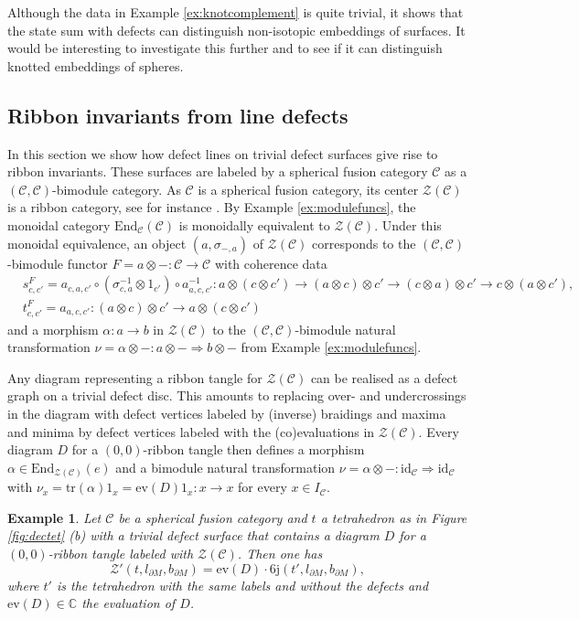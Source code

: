 \documentclass[1.5pt, a4paper]{article}
\newcommand{\C}{\mathbb{C}}
\newcommand{\mac}{\mathcal C}
\newcommand{\End}{\mathrm{End}}
\newcommand{\inv}[0]{{-1}}
\newcommand{\oo}[0]{\otimes}
\newcommand{\id}[0]{\mathrm{id}}
\newcommand{\tr}[0]{\mathrm{tr}}
\newtheorem{example}[theorem]{Example}
\begin{document}
 Although the data in Example \ref{ex:knotcomplement} is quite trivial, it shows that the state sum with defects can distinguish non-isotopic embeddings of surfaces. It would be interesting to  investigate this further and to see if it can distinguish  knotted embeddings of  spheres. 


\subsection{Ribbon invariants from line defects}


In this section we show how defect lines on trivial defect surfaces give rise to ribbon invariants.  These surfaces are labeled by a spherical fusion category $\mac$ as a $(\mac,\mac)$-bimodule category.   As $\mac$ is a spherical fusion category, its center $\mathcal Z(\mac)$ is a  ribbon category, see for instance \cite[Lemma 10.1]{TVr}. By Example \ref{ex:modulefuncs}, the monoidal category $\End_\mac(\mac)$  is  monoidally equivalent to $\mathcal Z(\mac)$. 
Under this monoidal equivalence, an object $(a, \sigma_{-,a})$ of $\mathcal Z(\mac)$  corresponds to the $(\mac,\mac)$-bimodule functor $F=a\oo -:\mac\to\mac$ with coherence data
\begin{align}\label{eq:coeherencecenter}
&s^F_{c,c'}=a_{c,a,c'}\circ (\sigma_{c,a}^\inv\oo 1_{c'})\circ a_{a,c,c'}^\inv: a\oo ( c\oo c')\to (a\oo c)\oo c'\to (c\oo a)\oo c'\to c\oo (a\oo c'),\\ 
&t^F_{c,c'}=a_{a,c,c'}: (a\oo c)\oo c'\to a\oo (c\oo c')\nonumber
\end{align}
and a morphism $\alpha: a\to b$ in $\mathcal Z(\mac)$  to the $(\mac,\mac)$-bimodule natural transformation $\nu=\alpha\oo -: a\oo -\Rightarrow b\oo -$ from Example \ref{ex:modulefuncs}. 

Any diagram representing a ribbon tangle for $\mathcal Z(\mac)$ can be realised as a defect graph on a trivial defect disc. This amounts to replacing
over- and undercrossings in the diagram  with defect vertices labeled by (inverse) braidings
and maxima and minima  by defect vertices labeled with the (co)evaluations in $\mathcal Z(\mac)$.
Every  diagram $D$ for a $(0,0)$-ribbon tangle  then defines a morphism $\alpha\in \End_{\mathcal Z(\mac)}(e)$ and
a  bimodule natural transformation $\nu=\alpha\oo -:\id_{\mac}\Rightarrow\id_\mac$  with
 $\nu_x=\tr(\alpha) 1_x=\mathrm{ev}(D)1_x: x\to x$ for every  $x\in I_\mac$.


\begin{example}\label{ex:ribbonplane} Let $\mac$ be a spherical fusion category and $t$ a tetrahedron as in Figure \ref{fig:dectet} (b) with a trivial defect surface that contains a diagram $D$ for a  $(0,0)$-ribbon tangle  labeled with  $\mathcal Z(\mac)$. 
Then one has
$$
\mathcal Z'(t, l_{\partial M}, b_{\partial M})=\mathrm{ev}(D) \cdot \mathrm{6j}(t', l_{\partial M}, b_{\partial M}),
$$
where $t'$ is the tetrahedron with the same labels and without the defects and $\mathrm{ev}(D)\in\C$ the evaluation of $D$.
\end{example}
\end{document}
